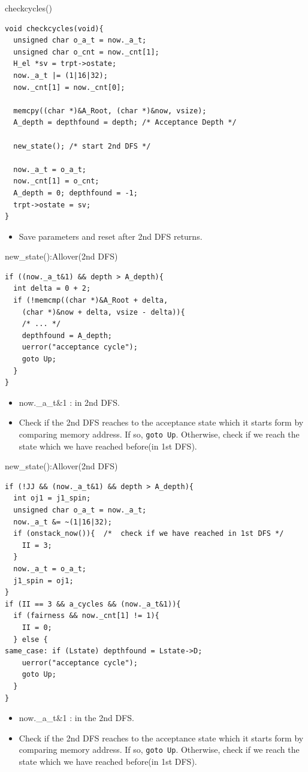 \documentclass[12pt]{beamer}
\newcommand{\code}[1]{\texttt{#1}}
\begin{document}
\begin{frame}[fragile]{checkcycles()}
\begin{lstlisting}[basicstyle=\footnotesize\ttfamily]
void checkcycles(void){
  unsigned char o_a_t = now._a_t;
  unsigned char o_cnt = now._cnt[1];
  H_el *sv = trpt->ostate;
  now._a_t |= (1|16|32);
  now._cnt[1] = now._cnt[0];

  memcpy((char *)&A_Root, (char *)&now, vsize);
  A_depth = depthfound = depth; /* Acceptance Depth */

  new_state(); /* start 2nd DFS */

  now._a_t = o_a_t;
  now._cnt[1] = o_cnt;
  A_depth = 0; depthfound = -1;
  trpt->ostate = sv;
}
\end{lstlisting}
\begin{itemize}
	\item Save parameters and reset after 2nd DFS returns.
\end{itemize}
\end{frame}

\begin{frame}[fragile]{new\_state():Allover(2nd DFS)}
\begin{lstlisting}[basicstyle=\footnotesize\ttfamily]
if ((now._a_t&1) && depth > A_depth){
  int delta = 0 + 2;
  if (!memcmp((char *)&A_Root + delta,
    (char *)&now + delta, vsize - delta)){
    /* ... */
    depthfound = A_depth;
    uerror("acceptance cycle");
    goto Up;
  }
}
\end{lstlisting}
\begin{itemize}
	\item now.\_a\_t\&1 : in 2nd DFS.
	\item Check if the 2nd DFS reaches to the acceptance state which it starts form by comparing memory address. If so, \code{goto Up}. Otherwise, check if we reach the state which we have reached before(in 1st DFS).
\end{itemize}
\end{frame}

\begin{frame}[fragile]{new\_state():Allover(2nd DFS)}
\begin{lstlisting}[basicstyle=\footnotesize\ttfamily]
if (!JJ && (now._a_t&1) && depth > A_depth){
  int oj1 = j1_spin;
  unsigned char o_a_t = now._a_t;
  now._a_t &= ~(1|16|32);
  if (onstack_now()){  /*  check if we have reached in 1st DFS */
    II = 3;
  }
  now._a_t = o_a_t;
  j1_spin = oj1;
}
if (II == 3 && a_cycles && (now._a_t&1)){
  if (fairness && now._cnt[1] != 1){
    II = 0;
  } else {
same_case: if (Lstate) depthfound = Lstate->D;
    uerror("acceptance cycle");
    goto Up;
  }
}
\end{lstlisting}
\begin{itemize}
	\item now.\_a\_t\&1 : in the 2nd DFS.
	\item Check if the 2nd DFS reaches to the acceptance state which it starts form by comparing memory address. If so, \code{goto Up}. Otherwise, check if we reach the state which we have reached before(in 1st DFS).
\end{itemize}
\end{frame}
\end{document}
